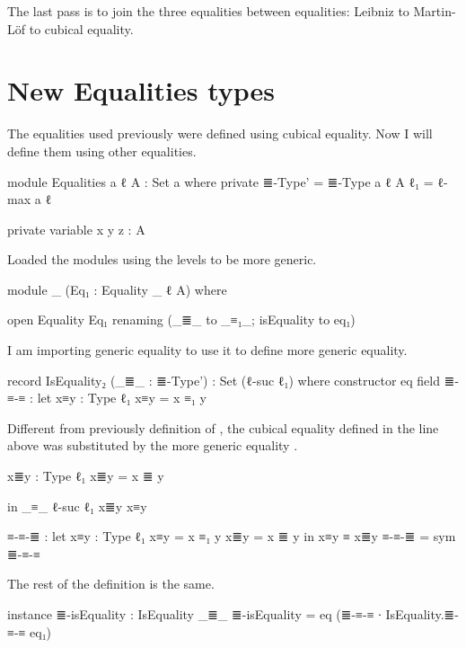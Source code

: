 \documentclass{article}
\begin{document}
The last pass is to join the three equalities between equalities:
Leibniz to Martin-Löf to cubical equality.

\section{New Equalities types}

The equalities used previously were defined using cubical equality.
Now I will define them using other equalities.

\begin{code}
module Equalities {a ℓ} {A : Set a} where
  private
    ≣-Type' = ≣-Type {a} {ℓ} {A}
    ℓ₁ = ℓ-max a ℓ

  private variable
    x y z : A
\end{code}

Loaded the modules using the levels to be more generic.

\begin{code}
  module _
    (Eq₁ : Equality {_} {ℓ} {A})
    where

    open Equality Eq₁ renaming (_≣_ to _≡₁_; isEquality to eq₁)
\end{code}

I am importing generic equality to use it to define more generic equality.

\begin{code}
    record IsEquality₂ (_≣_ : ≣-Type') : Set (ℓ-suc ℓ₁) where
      constructor eq
      field
        ≣-≡-≡ : let
          x≡y : Type ℓ₁
          x≡y = x ≡₁ y
\end{code}

Different from previously definition of ,
the cubical equality defined in the line above was substituted by
the more generic equality .

\begin{code}
          x≣y : Type ℓ₁
          x≣y = x ≣ y

          in _≡_ {ℓ-suc ℓ₁} x≣y x≡y

      ≡-≡-≣ : let
        x≡y : Type ℓ₁
        x≡y = x ≡₁ y
        x≣y = x ≣ y
        in x≡y ≡ x≣y
      ≡-≡-≣ = sym ≣-≡-≡

\end{code}

The rest of the definition is the same.

\begin{code}
      instance
        ≣-isEquality : IsEquality _≣_
        ≣-isEquality = eq (≣-≡-≡ ∙ IsEquality.≣-≡-≡ eq₁)
\end{code}
\end{document}
